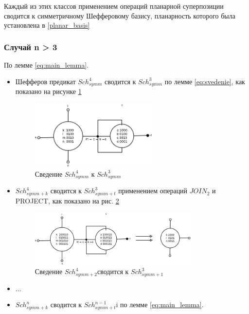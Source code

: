 \documentclass[12pt]{article}
\begin{document}
Каждый из этих классов применением операций планарной суперпозиции сводится к 
симметричному Шефферовому базису, планарность которого была установлена в \ref{planar_basis}

\subsubsection{Случай n > 3}
По лемме \ref{eq:main_lemma}.



\begin{itemize}
\item Шефферов предикат $Sch_{symm}^4$ сводится к $Sch_{symm}^3$ по лемме 
\ref{eq:svedenie}, как показано на рисунке \ref{fig:4to3}
\begin{figure}[htb]
\centering
\includegraphics[width=0.6\textwidth]{4to3.png}
\caption{Сведение $Sch_{symm}^4$ к $Sch_{symm}^3$ }
\label{fig:4to3}
\end{figure}


\item $Sch_{symm+k}^4$ сводится к $Sch_{symm+t}^3$ применением операций $JOIN_2$ и PROJECT, как показано на рис.
\ref{fig:4_2to3_1}
\begin{figure}[htb]
\centering
\includegraphics[width=0.8\textwidth]{4_2to3_1.png}
\caption{Сведение $Sch_{symm+2}^4$сводится к $Sch_{symm+1}^3$}
\label{fig:4_2to3_1}
\end{figure}
\item $\ldots$
\item $Sch_{symm+k}^n$ сводится к $Sch_{symm+t}^{n-1}$i по лемме \ref{eq:main_lemma}.

\end{itemize}
\end{document}
